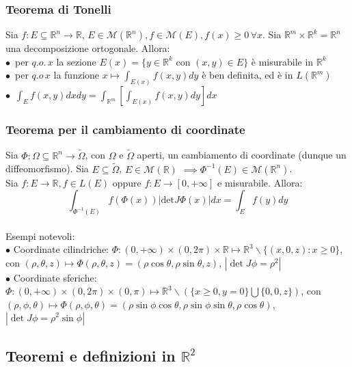 \documentclass{article} %
\begin{document}
    \subsubsection*{Teorema di Tonelli}
    Sia $f:E \subseteq \mathbb{R}^n \to \mathbb{R}$, $E \in \mathcal{M}(\mathbb{R}^n), f \in \mathcal{M}(E), f(x) \geq 0 \, \forall x$. Sia $\mathbb{R}^m \times \mathbb{R}^k = \mathbb{R}^n$ una decomposizione ortogonale. Allora: \\
    $\bullet \,$ per $q.o. \, x$ la sezione $E(x) = \{y \in \mathbb{R}^k$ con $(x,y) \in E \}$ è misurabile in $\mathbb{R}^k$ \\
    $\bullet \,$ per $q.o \, x$ la funzione $x \mapsto \int_{E(x)} f(x,y)dy$ è ben definita, ed è in $L(\mathbb{R}^m)$ \\
    $\bullet \,$ $\int_E f(x,y) dx dy = \int_{\mathbb{R}^m} \left[\int_{E(x)} f(x,y) dy\right] dx$


    \subsubsection*{Teorema per il cambiamento di coordinate}
    Sia $\Phi:\Omega \subseteq \mathbb{R}^n \to \tilde{\Omega} $, con $\Omega$ e $\tilde{\Omega}$ aperti, un cambiamento di coordinate (dunque un diffeomorfismo). Sia $E \subseteq \tilde{\Omega}$, $E \in \mathcal{M}(\mathbb{R})$ $\implies \Phi^{-1}(E) \in \mathcal{M}(\mathbb{R}^n)$.\\
    Sia $f:E \to \mathbb{R}, f \in L(E)$ oppure $f:E \to [0,+\infty]$ e misurabile. Allora:
    $$\int_{\Phi^{-1}(E)}f(\Phi (x)) \left| \text{det} J \Phi (x) \right| dx = \int_E f(y) dy$$ \\
    Esempi notevoli: \\
    $\bullet$ Coordinate cilindriche: $\Phi: (0, +\infty) \times (0,2 \pi) \times \mathbb{R} \longmapsto \mathbb{R}^3 \backslash \{(x,0,z): x \geq 0 \}$, con $(\rho, \theta, z)\longmapsto \Phi(\rho, \theta, z)=(\rho \cos \theta , \rho \sin \theta , z)$, $| \det J \phi = \rho^2 |$ \\
    $\bullet$ Coordinate sferiche: $\Phi: (0, +\infty) \times (0,2 \pi) \times (0, \pi) \longmapsto \mathbb{R}^3 \backslash (\{x \geq 0, y=0 \} \bigcup \{0,0,z\} )$, con $(\rho, \phi, \theta)\longmapsto \Phi(\rho, \phi, \theta)=(\rho \sin \phi \cos \theta , \rho \sin \phi \sin \theta , \rho \cos \theta )$, $| \det J \phi = \rho^2 \sin \phi |$

    \subsection{Teoremi e definizioni in $\mathbb{R}^2$}
\end{document}
